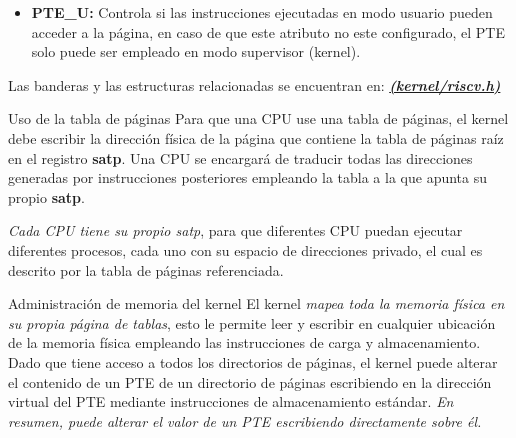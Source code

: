 \documentclass{libs/ufc_format}
\begin{document}
\begin{frame}{}
    \begin{itemize}
        \item \textbf{PTE\_U:} Controla si las instrucciones ejecutadas en modo usuario pueden acceder a la página, en caso de que este atributo no este configurado, el PTE solo puede ser empleado en modo supervisor (kernel).
    \end{itemize}

    \vspace{0.3cm}

    Las banderas y las estructuras relacionadas se encuentran en: \href{https://github.com/CarlosSandoval-03/xv6-riscv/blob/riscv/kernel/riscv.h}{\textbf{\textit{(kernel/riscv.h)}}} \cite{xv6_book} \cite{xv6}
\end{frame}
\begin{frame}{Uso de la tabla de páginas}
    Para que una CPU use una tabla de páginas, el kernel debe escribir la dirección física de la página que contiene la tabla de páginas raíz en el registro \textbf{satp}. Una CPU se encargará de traducir todas las direcciones generadas por instrucciones posteriores empleando la tabla a la que apunta su propio \textbf{satp}. \cite{xv6_book}
    
    \vspace{0.3cm}
    
    \emph{Cada CPU tiene su propio satp}, para que diferentes CPU puedan ejecutar diferentes procesos, cada uno con su espacio de direcciones privado, el cual es descrito por la tabla de páginas referenciada. \cite{xv6_book}
\end{frame}
\begin{frame}{Administración de memoria del kernel}
    El kernel \emph{mapea toda la memoria física en su propia página de tablas}, esto le permite leer y escribir en cualquier ubicación de la memoria física empleando las instrucciones de carga y almacenamiento. Dado que tiene acceso a todos los directorios de páginas, el kernel puede alterar el contenido de un PTE de un directorio de páginas escribiendo en la dirección virtual del PTE mediante instrucciones de almacenamiento estándar. \emph{En resumen, puede alterar el valor de un PTE escribiendo directamente sobre él. \cite{xv6_book}}
\end{frame}
\end{document}
